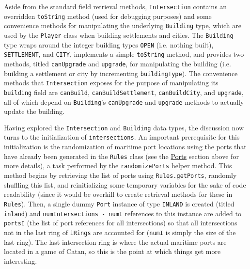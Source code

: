 \documentclass[pageno]{jpaper}
\begin{document}
\begin{doublespacing}
Aside from the standard field retrieval methods, \lstinline$Intersection$ contains an overridden \lstinline$toString$ method (used for debugging purposes) and some convenience methods for manipulating the underlying \lstinline$Building$ type, which are used by the \lstinline$Player$ class when building settlements and cities. The \lstinline$Building$ type wraps around the integer building types \lstinline$OPEN$ (i.e. nothing built), \lstinline$SETTLEMENT$, and \lstinline$CITY$, implements a simple \lstinline$toString$ method, and provides two methods, titled \lstinline$canUpgrade$ and \lstinline$upgrade$, for manipulating the building (i.e. building a settlement or city by incrementing \lstinline$buildingType$). The convenience methods that \lstinline$Intersection$ exposes for the purpose of manipulating its \lstinline$building$ field are \lstinline$canBuild$, \lstinline$canBuildSettlement$, \lstinline$canBuildCity$, and \lstinline$upgrade$, all of which depend on \lstinline$Building$'s \lstinline$canUpgrade$ and \lstinline$upgrade$ methods to actually update the building.

Having explored the \lstinline$Intersection$ and \lstinline$Building$ data types, the discussion now turns to the initialization of \lstinline$intersections$. An important prerequisite for this initialization is the randomization of maritime port locations using the ports that have already been generated in the \lstinline$Rules$ class (see the \hyperlink{sec:ports}{Ports} section above for more details), a task performed by the \lstinline$randomizePorts$ helper method. This method begins by retrieving the list of ports using \lstinline$Rules.getPorts$, randomly shuffling this list, and reinitializing some temporary variables for the sake of code readability (since it would be overkill to create retrieval methods for these in \lstinline$Rules$). Then, a single dummy \lstinline$Port$ instance of type \lstinline$INLAND$ is created (titled \lstinline$inland$) and \lstinline$numIntersections - numI$ references to this instance are added to \lstinline$portsI$ (the list of port references for all intersections) so that all intersections not in the last ring of \lstinline$iRings$ are accounted for (\lstinline$numI$ is simply the size of the last ring). The last intersection ring is where the actual maritime ports are located in a game of Catan, so this is the point at which things get more interesting.


\end{doublespacing}
\end{document}
